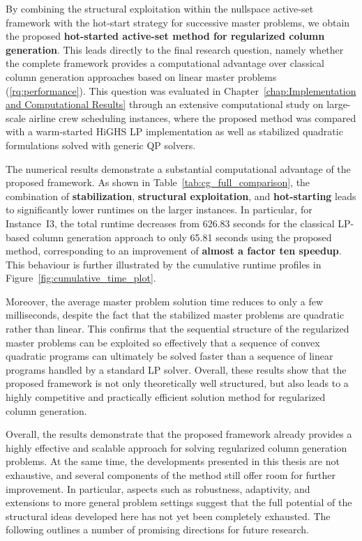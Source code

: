 \documentclass{book}
\theoremstyle{definition}
\numberwithin{algorithm_}{chapter}
\begin{document}
{\bigskip

By combining the structural exploitation within the nullspace active-set framework with the hot-start strategy for successive master problems, we obtain the proposed \textbf{hot-started active-set method for regularized column generation}. This leads directly to the final research question, namely whether the complete framework provides a computational advantage over classical column generation approaches based on linear master problems (\ref{rq:performance}). This question was evaluated in Chapter~\ref{chap:Implementation and Computational Results} through an extensive computational study on large-scale airline crew scheduling instances, where the proposed method was compared with a warm-started HiGHS LP implementation as well as stabilized quadratic formulations solved with generic QP solvers.

The numerical results demonstrate a substantial computational advantage of the proposed framework. As shown in Table~\ref{tab:cg_full_comparison}, the combination of \textbf{stabilization}, \textbf{structural exploitation}, and \textbf{hot-starting} leads to significantly lower runtimes on the larger instances. In particular, for Instance~I3, the total runtime decreases from 626.83 seconds for the classical LP-based column generation approach to only 65.81 seconds using the proposed method, corresponding to an improvement of \textbf{almost a factor ten speedup}. This behaviour is further illustrated by the cumulative runtime profiles in Figure~\ref{fig:cumulative_time_plot}.

Moreover, the average master problem solution time reduces to only a few milliseconds, despite the fact that the stabilized master problems are quadratic rather than linear. This confirms that the sequential structure of the regularized master problems can be exploited so effectively that a sequence of convex quadratic programs can ultimately be solved faster than a sequence of linear programs handled by a standard LP solver. Overall, these results show that the proposed framework is not only theoretically well structured, but also leads to a highly competitive and practically efficient solution method for regularized column generation.


\bigskip

Overall, the results demonstrate that the proposed framework already provides a highly effective and scalable approach for solving regularized column generation problems. At the same time, the developments presented in this thesis are not exhaustive, and several components of the method still offer room for further improvement. In particular, aspects such as robustness, adaptivity, and extensions to more general problem settings suggest that the full potential of the structural ideas developed here has not yet been completely exhausted. The following outlines a number of promising directions for future research.


}
\end{document}
